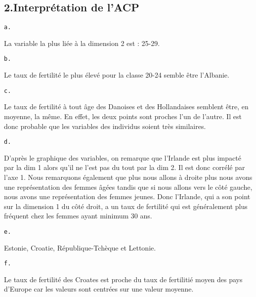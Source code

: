 \documentclass[
]{article}
\begin{document}
\hypertarget{interpruxe9tation-de-lacp}{%
\subsection{2.Interprétation de l'ACP}\label{interpruxe9tation-de-lacp}}

\begin{verbatim}
a. 
\end{verbatim}

La variable la plus liée à la dimension 2 est : 25-29.

\begin{verbatim}
b. 
\end{verbatim}

Le taux de fertilité le plus élevé pour la classe 20-24 semble être
l'Albanie.

\begin{verbatim}
c.
\end{verbatim}

Le taux de fertilité à tout âge des Danoises et des Hollandaises
semblent être, en moyenne, la même. En effet, les deux points sont
proches l'un de l'autre. Il est donc probable que les variables des
individus soient très similaires.

\begin{verbatim}
d.
\end{verbatim}

D'après le graphique des variables, on remarque que l'Irlande est plus
impacté par la dim 1 alors qu'il ne l'est pas du tout par la dim 2. Il
est donc corrélé par l'axe 1. Nous remarquons également que plus nous
allons à droite plus nous avons une représentation des femmes âgées
tandis que si nous allons vers le côté gauche, nous avons une
représentation des femmes jeunes. Donc l'Irlande, qui a son point sur la
dimension 1 du côté droit, a un taux de fertilité qui est généralement
plus fréquent chez les femmes ayant minimum 30 ans.

\begin{verbatim}
e.
\end{verbatim}

Estonie, Croatie, République-Tchèque et Lettonie.

\begin{verbatim}
f.
\end{verbatim}

Le taux de fertilité des Croates est proche du taux de fertilitié moyen
des pays d'Europe car les valeurs sont centrées sur une valeur moyenne.
\end{document}
